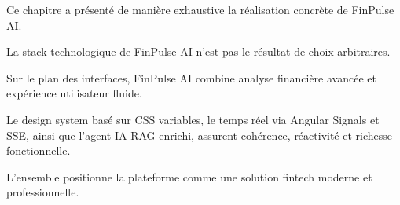 Ce chapitre a présenté de manière exhaustive la réalisation concrète de FinPulse AI.

La stack technologique de FinPulse AI n'est pas le résultat de choix arbitraires.

Sur le plan des interfaces, FinPulse AI combine analyse financière avancée et expérience utilisateur fluide.

Le design system basé sur CSS variables, le temps réel via Angular Signals et SSE, ainsi que l’agent IA RAG enrichi, assurent cohérence, réactivité et richesse fonctionnelle.

L’ensemble positionne la plateforme comme une solution fintech moderne et professionnelle.
